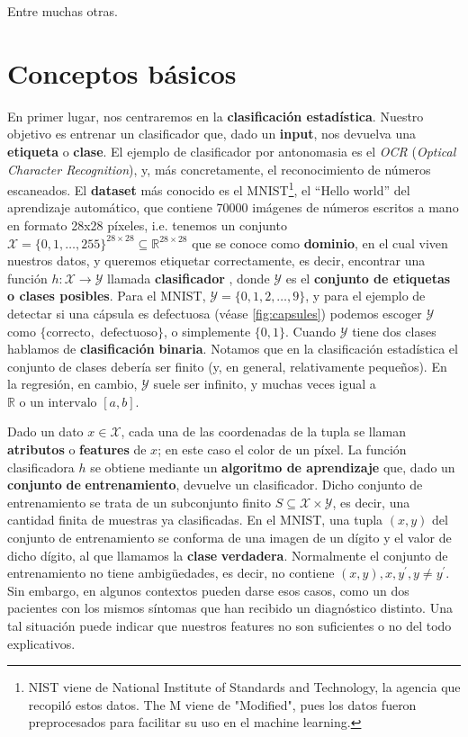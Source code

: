 \documentclass[a4paper, 12pt, oneside]{book}
\begin{document}
Entre muchas otras.

\section{Conceptos básicos}
En primer lugar, nos centraremos en la \textbf{clasificación estadística}. Nuestro objetivo es 
entrenar un clasificador que, dado un \textbf{input}, nos devuelva una \textbf{etiqueta} o 
\textbf{clase}. El ejemplo de clasificador por antonomasia es el \textit{OCR} (\textit{Optical Character Recognition}),
y, más concretamente, el reconocimiento de números escaneados. El \textbf{dataset} más
conocido es el  MNIST\footnote{NIST viene de National Institute of Standards and Technology, la agencia que recopiló estos datos. The M viene de "Modified", 
pues los datos fueron preprocesados para facilitar su uso en el machine learning.}, 
el ``Hello world''
del aprendizaje automático, que contiene 70000 imágenes de números escritos a mano en formato 28x28 píxeles, i.e. tenemos un conjunto \(\mathcal{X} = \{0, 1, \dots , 255\}^{28
\times28}\subseteq   \mathbb{R}^{28\times28}  \)
que se conoce como \textbf{dominio}, en el cual viven nuestros datos, y queremos etiquetar correctamente, es decir, encontrar una función \(h\colon \mathcal{X} \to \mathcal{Y} \) llamada \textbf{clasificador} , 
donde \(\mathcal{Y} \) es el \textbf{conjunto de etiquetas o clases posibles}. Para el MNIST, \(\mathcal{Y} = \{0,1,2, \dots , 9\}\), y para el ejemplo de detectar si una cápsula es defectuosa (véase \autoref{fig:capsules}) podemos escoger \(\mathcal{Y} \) como  \(\{\text{correcto} , \text{ defectuoso} \}\), o simplemente \(\{ 0, 1 \}\). Cuando \(\mathcal{Y}  \) tiene dos clases hablamos de \textbf{clasificación} \textbf{binaria}. Notamos que en la clasificación estadística el conjunto de clases debería ser finito (y, en general, relativamente pequeños). En la regresión, en cambio, \(\mathcal{Y} \) suele ser infinito,
y muchas veces igual a \(\mathbb{R} \text{ o un intervalo } [a, b]\).   

Dado un dato \(x \in \mathcal{X} \), cada una de las coordenadas de la tupla se llaman 
\textbf{atributos} o \textbf{features} de \(x\); en este caso el color de un píxel. La función clasificadora \(h\) se obtiene mediante un \textbf{algoritmo de aprendizaje} que, dado un \textbf{conjunto} \textbf{de} \textbf{entrenamiento}, devuelve un clasificador. 
Dicho conjunto de entrenamiento se trata de un subconjunto finito \(S \subseteq \mathcal{X} \times \mathcal{Y} \), es decir, una cantidad finita de muestras ya clasificadas. En el MNIST, 
una tupla \((x, y)\) del conjunto de entrenamiento se conforma de una imagen de un dígito
y el valor de dicho dígito, al que llamamos la \textbf{clase} \textbf{verdadera}. 
Normalmente el conjunto de entrenamiento no tiene ambigüedades, es decir, no contiene
\((x, y), x, y^{\prime}, y\neq y^{\prime} \). Sin embargo, en algunos contextos pueden
darse esos casos, como un dos pacientes con los mismos síntomas que han recibido un 
diagnóstico distinto. Una tal situación puede indicar que nuestros features no son 
suficientes o no del todo explicativos.
\end{document}
